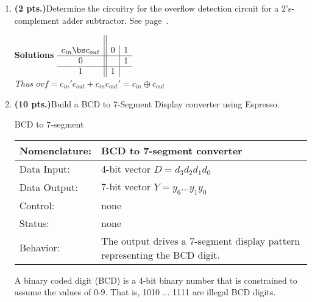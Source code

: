 \begin{enumerate}
        \item \textbf{ (2 pts.)}Determine the circuitry for the overflow detection
            circuit for a 2's-complement adder subtractor.  See page~\pageref{4-page:Ovf}.

            \begin{onlysolution} \textbf{Solutions} \itshape{
                    $
                    \begin{array} {c||c|c} \\
                        c_{in}  \bs c_{out} & 0 & 1 \\ \hline
                        0    &   & 1 \\ \hline
                        1    & 1 &   \\
                    \end{array}$   \\
                    Thus $ovf = c_{in}' c_{out} + c_{in} c_{out}' =  c_{in} \oplus c_{out} $
                }
            \end{onlysolution}

        \item \textbf{ (10 pts.)}Build a BCD to 7-Segment Display converter using
            Espresso.

            \begin{buildingblock}{BCD to 7-segment}
                \label{page:7seg}
                \begin{tabular}{|l|p{3.5in}|} \hline
                    Nomenclature:  & BCD to 7-segment converter                \\ \hline
                    Data Input:    & 4-bit vector $D=d_3 d_2 d_1 d_0$  \\ \hline
                    Data Output:   & 7-bit vector $Y=y_6 \ldots y_1 y_0$    \\ \hline
                    Control:       & none                                   \\ \hline
                    Status:        & none                                   \\ \hline
                    Behavior:      & The output drives a 7-segment display pattern
                    representing the BCD digit.  \\ \hline
                \end{tabular}
            \end{buildingblock}

            A binary coded digit (BCD) is a 4-bit binary number that is constrained
            to assume the values of 0-9. That is, 1010 ... 1111 are illegal BCD digits.


\end{enumerate}

